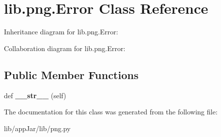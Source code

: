 \hypertarget{classlib_1_1png_1_1_error}{}\section{lib.\+png.\+Error Class Reference}
\label{classlib_1_1png_1_1_error}


Inheritance diagram for lib.\+png.\+Error\+:


Collaboration diagram for lib.\+png.\+Error\+:
\subsection*{Public Member Functions}
\begin{DoxyCompactItemize}
\item 
\mbox{\label{classlib_1_1png_1_1_error_a4e27496cd9ddaeb6e289c62e609a2407}} 
def {\bfseries \+\_\+\+\_\+str\+\_\+\+\_\+} (self)
\end{DoxyCompactItemize}


The documentation for this class was generated from the following file\+:\begin{DoxyCompactItemize}
\item 
lib/app\+Jar/lib/png.\+py\end{DoxyCompactItemize}

